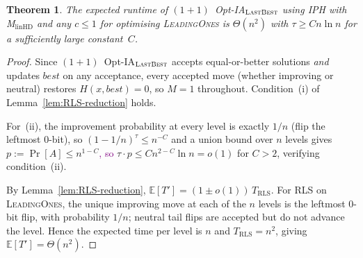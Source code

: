 \documentclass[lettersize,journal]{IEEEtran}
\newcommand{\rerev}[1]{\textcolor{purple}{#1}}
\newcommand{\EE}{\mathbb{E}}
\newcommand{\linHD}{M$_{\text{linHD}}$}
\newcommand{\IPHfcm}{IPH}
\newcommand{\lastBest}{$(1+1)$~Opt-IA$_{\textsc{LastBest}}$}
\newtheorem{theorem}{Theorem}
\begin{document}
\begin{theorem}\label{thm:LBleadingones}
The expected runtime of \lastBest{} using \IPHfcm{} with \linHD{} and any
$c\leq 1$ for optimising \textsc{LeadingOnes} is $\Theta(n^2)$ with
$\tau\geq Cn\ln n$ for a sufficiently large constant~$C$.
\end{theorem}
\begin{proof}
Since \lastBest{} accepts equal-or-better solutions \emph{and} updates
$\mathit{best}$ on any acceptance, every accepted move (whether improving or
neutral) restores $H(x,\mathit{best})=0$, so $M=1$ throughout.
Condition~(i) of Lemma~\ref{lem:RLS-reduction} holds.

For~(ii), the improvement probability at every level is exactly $1/n$
(flip the leftmost $0$-bit), so $(1-1/n)^\tau\leq n^{-C}$
and a union bound over $n$ levels gives $p:=\Pr[A]\leq n^{1-C}$\rerev{, so}
$\tau\cdot p\leq Cn^{2-C}\ln n=o(1)$ for $C>2$, verifying
condition~(ii).

By Lemma~\ref{lem:RLS-reduction},
$\EE[T']=(1\pm o(1))\,T_{\mathrm{RLS}}$.
For RLS on \textsc{LeadingOnes}, the unique improving move at each of the $n$
levels is the leftmost $0$-bit flip, with probability $1/n$; neutral tail
flips are accepted but do not advance the level.  Hence the expected time per
level is $n$ and $T_{\mathrm{RLS}}=n^2$, giving $\EE[T']=\Theta(n^2)$.
\end{proof}
\end{document}
